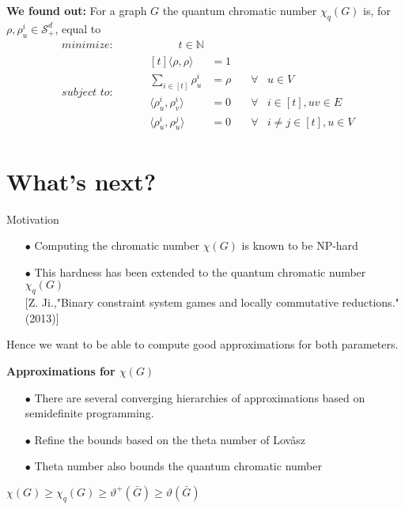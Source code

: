 \documentclass[13.5pt]{beamer}
\begin{document}
\begin{frame}
\begin{block}{\color{colorblue}\textbf{We found out:}}
For a graph $G$ the quantum chromatic number $\chi_q(G)$ is, for $\rho, \rho_u^i \in \mathcal{S}_+^d$, equal to 
	\begin{equation*} 
	\begin{alignedat}{2}
	& \textit{minimize: } & &  \qquad \quad t \in \mathbb{N} \\
	& \textit{subject to: }& \quad   &\begin{aligned}[t] \langle \rho, \rho \rangle &  = 1  &  &  \\
	\sum\limits_{i\in [t]} \rho_{u}^i  & = \rho & \quad \forall &u \in V \\
	\langle \rho_{u}^i, \rho_{v}^i \rangle   & =0 & \quad \forall & i \in [t], uv \in E \\ 
	\langle \rho_{u}^i, \rho_{u}^j \rangle   & =0 & \quad \forall & i \neq j \in [t], u \in V
	\end{aligned}
	\end{alignedat}
	\end{equation*}
\end{block}
\end{frame}

\section{What's next?}
\begin{frame}{Motivation}
\begin{itemize}
\item[$\bullet$] Computing the chromatic number $\chi (G)$ is known to be NP-hard
\item[$\bullet$] This hardness has been extended to the quantum chromatic number $\chi_q(G)$ \\
{\footnotesize[Z. Ji.,"Binary constraint system games and locally commutative reductions."(2013)]}
\end{itemize}

Hence we want to be able to compute good approximations for both parameters.

\end{frame}

\begin{frame}
\begin{block}{\color{colorblue}\textbf{Approximations for $\chi (G)$}}
\begin{itemize}
\item[$\bullet$] There are several converging hierarchies of approximations based on semidefinite programming.
\item[$\bullet$] Refine the bounds based on the theta number of Lovâsz
\item[$\bullet$] Theta number also bounds the quantum chromatic number
\end{itemize}
\end{block}

\begin{center}
$\chi(G) \geq \chi_q(G) \geq \vartheta^+(\bar{G}) \geq \vartheta(\bar{G})$
\end{center}
\end{frame}
\end{document}
